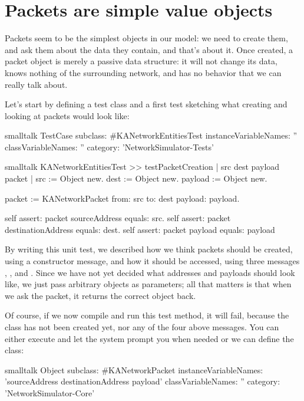 \documentclass[10pt,twoside,english]{_support/latex/sbabook/sbabook}
\begin{document}
\section{Packets are simple value objects}
Packets seem to be the simplest objects in our model: we need to create them, and ask them about the data they contain, and that's about it.
Once created, a packet object is merely a passive data structure: it will not change its data, knows nothing of the surrounding network, and has no behavior that we can really talk about.

Let's start by defining a test class and a first test sketching what creating and looking at packets would look like:

\begin{displaycode}{smalltalk}
TestCase subclass: #KANetworkEntitiesTest
    instanceVariableNames: ''
    classVariableNames: ''
    category: 'NetworkSimulator-Tests'
\end{displaycode}

\begin{displaycode}{smalltalk}
KANetworkEntitiesTest >> testPacketCreation
    | src dest payload packet |
    src := Object new.
    dest := Object new.
    payload := Object new.

    packet := KANetworkPacket from: src to: dest payload: payload.

    self assert: packet sourceAddress equals: src.
    self assert: packet destinationAddress equals: dest.
    self assert: packet payload equals: payload
\end{displaycode}

By writing this unit test, we described how we think packets should be created, using a  constructor message, and how it should be accessed, using three messages , , and .
Since we have not yet decided what addresses and payloads should look like, we just pass arbitrary objects as parameters; all that matters is that when we ask the packet, it returns the correct object back.

Of course, if we now compile and run this test method, it will fail, because the class  has not been created yet, nor any of the four above messages.
You can either execute and let the system prompt you when needed or we can define the class:

\begin{displaycode}{smalltalk}
Object subclass: #KANetworkPacket
    instanceVariableNames: 'sourceAddress destinationAddress payload'
    classVariableNames: ''
    category: 'NetworkSimulator-Core'
\end{displaycode}
\end{document}
